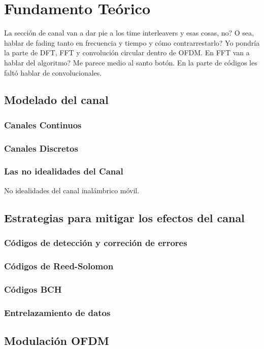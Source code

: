 \chapter{Fundamento Teórico}

La sección de canal van a dar pie a los time interleavers y esas cosas, no? O sea, hablar de fading tanto en frecuencia y tiempo y cómo contrarrestarlo?
Yo pondría la parte de DFT, FFT y convolución circular dentro de OFDM. En FFT van a hablar del algoritmo? Me parece medio al santo botón.
En la parte de códigos les faltó hablar de convolucionales.


\section{Modelado del canal}
	\subsection{Canales Continuos}
	\subsection{Canales Discretos}
	\subsection{Las no idealidades del Canal}
No idealidades del canal inalámbrico móvil.

\section{Estrategias para mitigar los efectos del canal}

	\subsection{C\'odigos de detecci\'on y correci\'on de errores}
	\subsection{C\'odigos de Reed-Solomon}
	\subsection{C\'odigos BCH}
	\subsection{Entrelazamiento de datos}

\section{Modulación OFDM}

